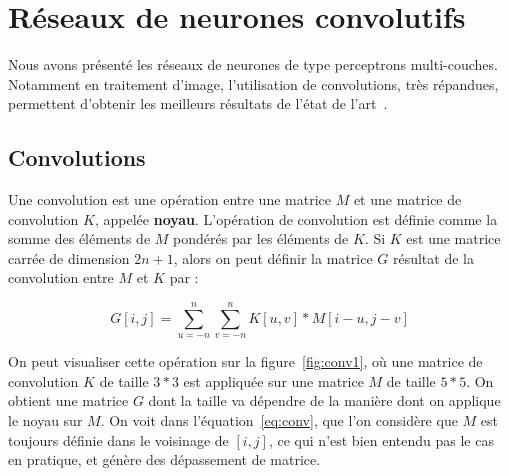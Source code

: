 \section{Réseaux de neurones convolutifs}

Nous avons présenté les réseaux de neurones de type perceptrons multi-couches.
Notamment en traitement d'image, l’utilisation de convolutions, très répandues, permettent d'obtenir les meilleurs résultats de l'état de l'art~\cite{krizhevsky2012imagenet, simonyan2014very, he2016deep, hu2017squeeze}.


\subsection{Convolutions}


Une convolution est une opération entre une matrice $M$ et une matrice de convolution $K$, appelée \textbf{noyau}.
L'opération de convolution est définie comme la somme des éléments de $M$ pondérés par les éléments de $K$.
Si $K$ est une matrice carrée de dimension $2n+1$, alors on peut définir la matrice $G$ résultat de la convolution entre $M$ et $K$ par :

\begin{equation}
G[i,j] = \sum_{u=-n}^{n} \sum_{v=-n}^{n} K[u,v]*M[i-u, j-v]
\label{eq:conv}
\end{equation}

On peut visualiser cette opération sur la figure~\ref{fig:conv1}, où une matrice de convolution $K$ de taille $3*3$ est appliquée sur une matrice $M$ de taille $5*5$.
On obtient une matrice $G$ dont la taille va dépendre de la manière dont on applique le noyau sur $M$.
On voit dans l'équation~\ref{eq:conv}, que l'on considère que $M$ est toujours définie dans le voisinage de $[i,j]$, ce qui n'est bien entendu pas le cas en pratique, et génère des dépassement de matrice.



